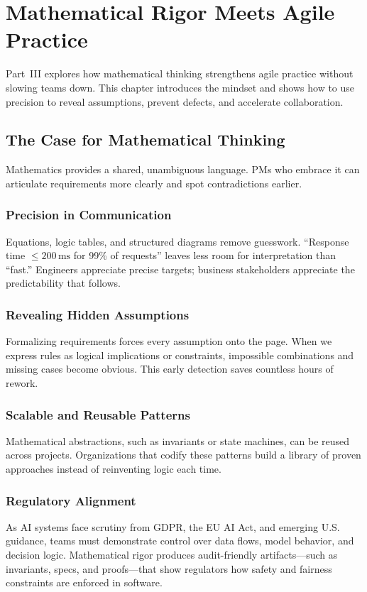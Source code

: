 \chapter{Mathematical Rigor Meets Agile Practice}
\label{ch:mathematical-rigor}

Part~III explores how mathematical thinking strengthens agile practice without slowing teams down. This chapter introduces the mindset and shows how to use precision to reveal assumptions, prevent defects, and accelerate collaboration.

\section{The Case for Mathematical Thinking}
\label{sec:case-math}

Mathematics provides a shared, unambiguous language. PMs who embrace it can articulate requirements more clearly and spot contradictions earlier.

\subsection{Precision in Communication}
Equations, logic tables, and structured diagrams remove guesswork. ``Response time $\le 200\,\text{ms}$ for 99\% of requests'' leaves less room for interpretation than ``fast.'' Engineers appreciate precise targets; business stakeholders appreciate the predictability that follows.

\subsection{Revealing Hidden Assumptions}
Formalizing requirements forces every assumption onto the page. When we express rules as logical implications or constraints, impossible combinations and missing cases become obvious. This early detection saves countless hours of rework.

\subsection{Scalable and Reusable Patterns}
Mathematical abstractions, such as invariants or state machines, can be reused across projects. Organizations that codify these patterns build a library of proven approaches instead of reinventing logic each time.

\subsection{Regulatory Alignment}
As AI systems face scrutiny from GDPR, the EU AI Act, and emerging U.S. guidance, teams must demonstrate control over data flows, model behavior, and decision logic. Mathematical rigor produces audit-friendly artifacts—such as invariants, specs, and proofs—that show regulators how safety and fairness constraints are enforced in software.

